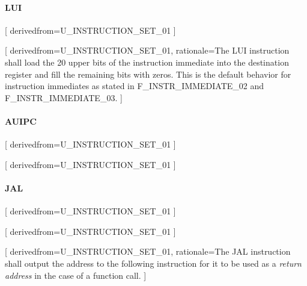       \label{instruction-behaviors-requirements}

      \paragraph{LUI}

      [
          derivedfrom=U\_INSTRUCTION\_SET\_01
        ]

      [
          derivedfrom=U\_INSTRUCTION\_SET\_01,
          rationale=The LUI instruction shall load the 20 upper bits of the instruction immediate into the destination register and fill the remaining bits with zeros. This is the default behavior for instruction immediates as stated in F\_INSTR\_IMMEDIATE\_02 and F\_INSTR\_IMMEDIATE\_03.
        ]

      \paragraph{AUIPC}

      [
          derivedfrom=U\_INSTRUCTION\_SET\_01
        ]

      [
          derivedfrom=U\_INSTRUCTION\_SET\_01
        ]

      \paragraph{JAL}

      [
          derivedfrom=U\_INSTRUCTION\_SET\_01
        ]

      [
          derivedfrom=U\_INSTRUCTION\_SET\_01
        ]

      [
          derivedfrom=U\_INSTRUCTION\_SET\_01,
          rationale=The JAL instruction shall output the address to the following instruction for it to be used as a \textit{return address} in the case of a function call.
        ]

